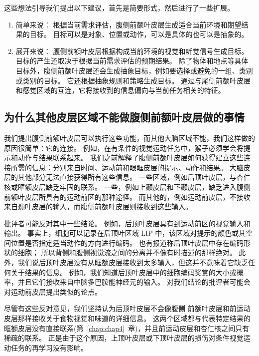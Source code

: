这些想法引导我们提出以下建议，首先是简要形式，然后进行了一些扩展。
\begin{enumerate}
\item 简单来说：
根据当前需求评估，腹侧前额叶皮层生成适合当前环境和期望结果的目标。 
目标可以是对象、位置或动作，可以是具体的也可以是抽象的。
\item  展开来说：
腹侧前额叶皮层根据构成当前环境的视觉和听觉信号生成目标。
目标的产生还取决于根据当前需求评估的预期结果。 
除了物体和地点等具体目标外，腹侧前额叶皮层还会生成抽象目标，例如要选择或避免的一组、类别或类别的目标。 
它还根据抽象规则和策略生成目标。 通过与尾侧前额叶皮层和感觉区域的互连，它将接收到的信息偏向与当前任务相关的特征。
\end{enumerate}



\subsection{为什么其他皮层区域不能做腹侧前额叶皮层做的事情}
\par

我们提出腹侧前额叶皮层可以执行这些功能，而其他大脑区域不能，我们这样做的原因很简单：它的连接。
例如，在有条件的视觉运动任务中，猴子必须学会将提示和动作与结果联系起来。
我们之前解释了腹侧前额叶皮层如何获得建立这些连接所需的信息：分别来自时间、运动前和眼眶皮层的提示、动作和结果。
大脑皮层的其他部分无法直接获得所有这些信息。
一些区域，例如后顶叶皮层，与杏仁核或眶额皮层缺乏牢固的联系。
一些，例如上颞皮层和下颞皮层，缺乏进入腹侧前额叶皮层所具有的运动前区的那种途径。
而其他的，例如运动前皮层，不接收来自颞叶皮层的输入，而腹侧前额叶皮层则接收到这些输入。
\par


批评者可能反对其中一些结论。
例如，后顶叶皮层具有到运动前区的视觉输入和输出。
事实上，细胞可以记录在后顶叶区域 LIP 中，该区域对提示的颜色或其空间位置是否指定适当动作的方向进行编码\cite{toth2002dynamic}。
也有报道称后顶叶皮层中存在编码形状的细胞\cite{janssen2008coding}； 所以背侧和腹侧视觉流之间的分离并不像有时描述的那样绝对。
此外，我们说后顶叶皮层没有从眶额皮层接收到太多输入，但这并不意味着它缺乏任何关于结果的信息。
例如，我们知道后顶叶皮层中的细胞编码奖赏的大小或概率\cite{platt1999neural}，并且它们接收来自中脑多巴胺能神经元的输入。
对我们结论的批评者可能会对运动前皮层提出类似的论点。
\par


尽管有这些反对意见，我们坚持认为后顶叶皮层不会像腹侧 前额叶皮层和前运动皮层那样接收关于食物视觉和味道的详细信息。 
这两个区域都与代表特定结果的眶额皮层没有直接联系(第~\ref{chap:chap4}~章)，并且前运动皮层和杏仁核之间只有稀疏的联系\cite{avendan1983evidence}。
正是由于这个原因，上顶叶皮层或下顶叶皮层的损伤对条件视觉运动任务的再学习没有影响\cite{rushworth1997parietal}。
\par 


